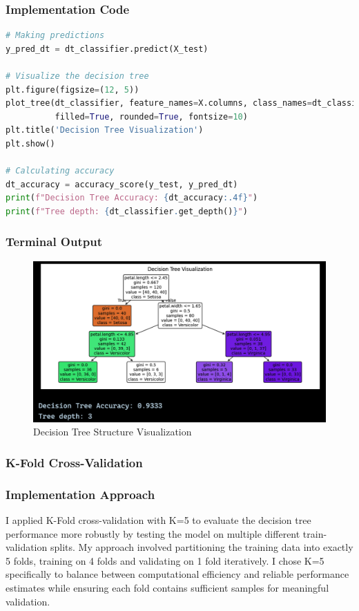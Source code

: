 \documentclass[12pt,a4paper]{article}
\begin{document}
\subsubsection{Implementation Code}
\begin{lstlisting}[language=Python, caption=Visualize the Tree and Compute Accuracy]
# Making predictions
y_pred_dt = dt_classifier.predict(X_test)

# Visualize the decision tree
plt.figure(figsize=(12, 5))
plot_tree(dt_classifier, feature_names=X.columns, class_names=dt_classifier.classes_, 
          filled=True, rounded=True, fontsize=10)
plt.title('Decision Tree Visualization')
plt.show()

# Calculating accuracy
dt_accuracy = accuracy_score(y_test, y_pred_dt)
print(f"Decision Tree Accuracy: {dt_accuracy:.4f}")
print(f"Tree depth: {dt_classifier.get_depth()}")
\end{lstlisting}

\newpage
\subsubsection{Terminal Output}

\begin{figure}[h!]
    \centering
    \includegraphics[width=\textwidth]{Figures/visualize.png}
    \caption{Decision Tree Structure Visualization}
    \label{fig:dt_structure}
\end{figure}

\subsubsection{K-Fold Cross-Validation}

\subsubsection{Implementation Approach}
I applied K-Fold cross-validation with K=5 to evaluate the decision tree performance more robustly by testing the model on multiple different train-validation splits. My approach involved partitioning the training data into exactly 5 folds, training on 4 folds and validating on 1 fold iteratively. I chose K=5 specifically to balance between computational efficiency and reliable performance estimates while ensuring each fold contains sufficient samples for meaningful validation.
\end{document}
